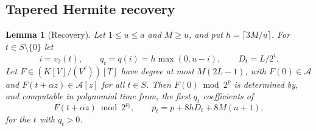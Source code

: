 \documentclass[11pt,reqno]{amsart}
\numberwithin{equation}{section}
\theoremstyle{plain}
\newtheorem{lemma}[theorem]{Lemma}
\theoremstyle{definition}
\theoremstyle{remark}
\newcommand{\cA}{\mathcal{A}}
\newcommand{\vtwo}{v_2}
\begin{document}
\subsection{Tapered Hermite recovery}\label{app:hermite}
\begin{lemma}[Recovery]\label{lem:recovery}
Let $1\le u\le a$ and $M\ge u$, and put $h=\lceil3M/u\rceil$. For $t\in S\setminus\{0\}$
let
\[
i=\vtwo(t),\qquad q_t=q(i)=h\max(0,u-i),\qquad D_t=L/2^i .
\]
Let $F\in(K[V]/(V^\ell))[T]$ have degree at most $M(2L-1)$, with $F(0)\in\cA$ and
$F(t+\alpha z)\in\cA[z]$ for all $t\in S$. Then $F(0)\bmod2^p$ is determined by,
and computable in polynomial time from, the first $q_t$ coefficients of
\[
F(t+\alpha z)\bmod2^{p_t},\qquad p_t=p+8hD_t+8M(a+1),
\]
for the $t$ with $q_t>0$.
\end{lemma}
\end{document}

